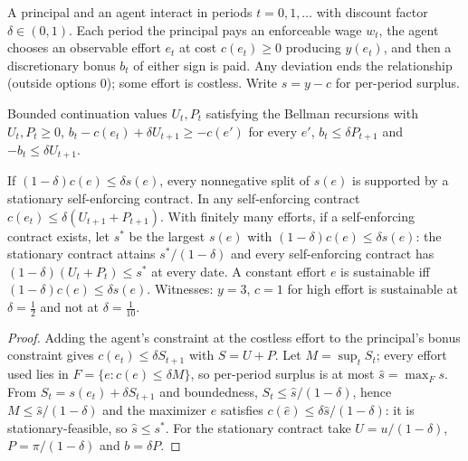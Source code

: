 A principal and an agent interact in periods $t = 0, 1, \dots$ with discount factor $\delta \in (0,1)$. Each period
the principal pays an enforceable wage $w_t$, the agent chooses an observable effort $e_t$ at cost $c(e_t) \ge 0$
producing $y(e_t)$, and then a discretionary bonus $b_t$ of either sign is paid. Any deviation ends the relationship
(outside options $0$); some effort is costless. Write $s = y - c$ for per-period surplus.

\begin{definition}
\label{def:self-enforcing}
\leanok
Bounded continuation values $U_t, P_t$ satisfying the Bellman recursions with
$U_t, P_t \ge 0$, $b_t - c(e_t) + \delta U_{t+1} \ge -c(e')$ for every $e'$, $b_t \le \delta P_{t+1}$ and
$-b_t \le \delta U_{t+1}$.
\end{definition}

\begin{theorem}
\label{thm:levin-stationary}
\leanok
{}
If $(1-\delta)c(e) \le \delta s(e)$, every nonnegative split of $s(e)$ is supported by a stationary self-enforcing
contract. In any self-enforcing contract $c(e_t) \le \delta (U_{t+1} + P_{t+1})$. With finitely many efforts, if a
self-enforcing contract exists, let $s^*$ be the largest $s(e)$ with $(1-\delta)c(e) \le \delta s(e)$: the stationary
contract attains $s^*/(1-\delta)$ and every self-enforcing contract has $(1-\delta)(U_t + P_t) \le s^*$ at every
date. A constant effort $e$ is sustainable iff $(1-\delta)c(e) \le \delta s(e)$. Witnesses: $y = 3$, $c = 1$ for high
effort is sustainable at $\delta = \tfrac12$ and not at $\delta = \tfrac1{10}$.
\end{theorem}
\begin{proof}
\leanok
Adding the agent's constraint at the costless effort to the principal's bonus constraint gives
$c(e_t) \le \delta S_{t+1}$ with $S = U + P$. Let $M = \sup_t S_t$; every effort used lies in
$F = \{e : c(e) \le \delta M\}$, so per-period surplus is at most $\hat s = \max_F s$. From
$S_t = s(e_t) + \delta S_{t+1}$ and boundedness, $S_t \le \hat s/(1-\delta)$, hence $M \le \hat s/(1-\delta)$ and the
maximizer $\hat e$ satisfies $c(\hat e) \le \delta \hat s/(1-\delta)$: it is stationary-feasible, so $\hat s \le s^*$.
For the stationary contract take $U = u/(1-\delta)$, $P = \pi/(1-\delta)$ and $b = \delta P$.
\end{proof}

